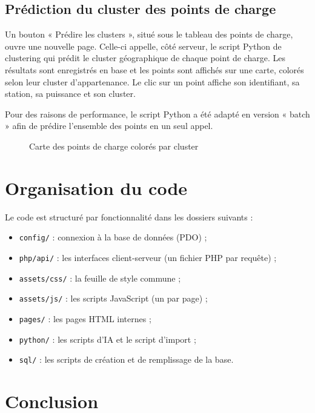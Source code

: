 \documentclass[a4paper,11pt]{article}
\begin{document}
\subsection{Prédiction du cluster des points de charge}

Un bouton « Prédire les clusters », situé sous le tableau des points de charge, ouvre une
nouvelle page. Celle-ci appelle, côté serveur, le script Python de clustering qui prédit
le cluster géographique de chaque point de charge. Les résultats sont enregistrés en base
et les points sont affichés sur une carte, colorés selon leur cluster d'appartenance. Le
clic sur un point affiche son identifiant, sa station, sa puissance et son cluster.

Pour des raisons de performance, le script Python a été adapté en version « batch » afin
de prédire l'ensemble des points en un seul appel.

\begin{figure}[h]
  \centering
  \caption{Carte des points de charge colorés par cluster}
\end{figure}

\section{Organisation du code}

Le code est structuré par fonctionnalité dans les dossiers suivants :

\begin{itemize}[noitemsep]
  \item \texttt{config/} : connexion à la base de données (PDO) ;
  \item \texttt{php/api/} : les interfaces client-serveur (un fichier PHP par requête) ;
  \item \texttt{assets/css/} : la feuille de style commune ;
  \item \texttt{assets/js/} : les scripts JavaScript (un par page) ;
  \item \texttt{pages/} : les pages HTML internes ;
  \item \texttt{python/} : les scripts d'IA et le script d'import ;
  \item \texttt{sql/} : les scripts de création et de remplissage de la base.
\end{itemize}

\section{Conclusion}

\end{document}

